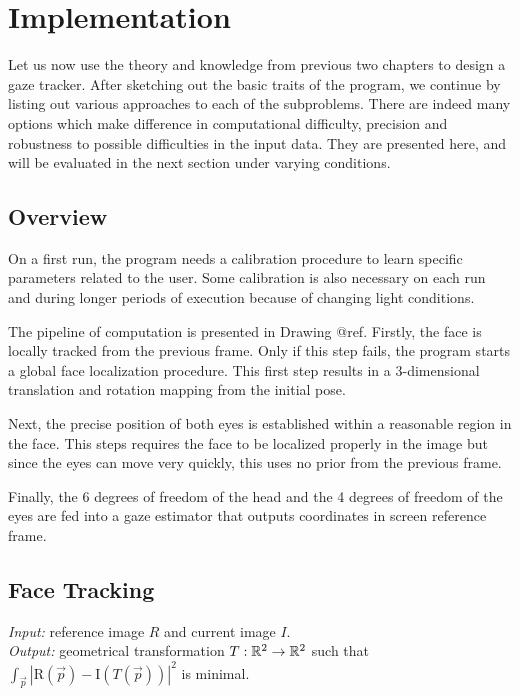 \chapter{Implementation}

Let us now use the theory and knowledge from previous two chapters to design a gaze tracker.
After sketching out the basic traits of the program, we continue by listing out various approaches to each of the subproblems.
There are indeed many options which make difference in computational difficulty, precision and robustness to possible difficulties in the input data.
They are presented here, and will be evaluated in the next section under varying conditions.

\section{Overview}

On a first run, the program needs a calibration procedure to learn specific parameters related to the user.
Some calibration is also necessary on each run and during longer periods of execution because of changing light conditions.

The pipeline of computation is presented in Drawing @ref.
Firstly, the face is locally tracked from the previous frame.
Only if this step fails, the program starts a global face localization procedure.
This first step results in a 3-dimensional translation and rotation mapping from the initial pose.

Next, the precise position of both eyes is established within a reasonable region in the face.
This steps requires the face to be localized properly in the image but since the eyes can move very quickly, this uses no prior from the previous frame.

Finally, the 6 degrees of freedom of the head and the 4 degrees of freedom of the eyes are fed into a gaze estimator that outputs coordinates in screen reference frame.

\section{Face Tracking}

\textit{Input:} reference image $R$ and current image $I$.\\
\textit{Output:} geometrical transformation $T: \mathbb{R}^2 \to \mathbb{R}^2$ such that $\int_{\vec p} |\textrm{R}(\vec p) - \textrm{I}(T(\vec p))|^2$ is minimal.\\

